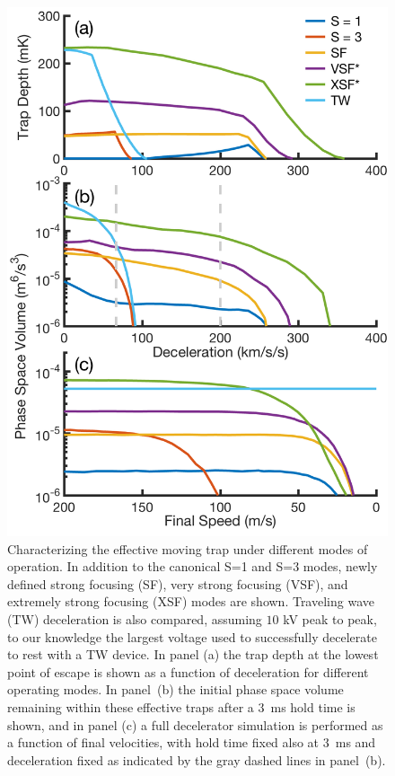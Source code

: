 \documentclass[%
 reprint,
 amsmath,amssymb,
 aps,
prl,
]{revtex4-1}
\begin{document}
\begin{figure}[t]
\includegraphics[width=\linewidth]{full-three-panel.png}%
\caption{
Characterizing the effective moving trap under different modes of operation. In addition to the canonical S=1 and S=3 modes, newly defined strong focusing (SF), very strong focusing (VSF), and extremely strong focusing (XSF) modes are shown. Traveling wave (TW) deceleration is also compared, assuming $10$ kV peak to peak, to our knowledge the largest voltage used to successfully decelerate to rest with a TW device. In panel (a) the trap depth at the lowest point of escape is shown as a function of deceleration for different operating modes. In panel~(b) the initial phase space volume remaining within these effective traps after a $3$~ms hold time is shown, and in panel (c) a full decelerator simulation is performed as a function of final velocities, with hold time fixed also at $3$~ms and deceleration fixed as indicated by the gray dashed lines in panel~(b).}
\label{fig:efftrap}
\end{figure}
\end{document}
